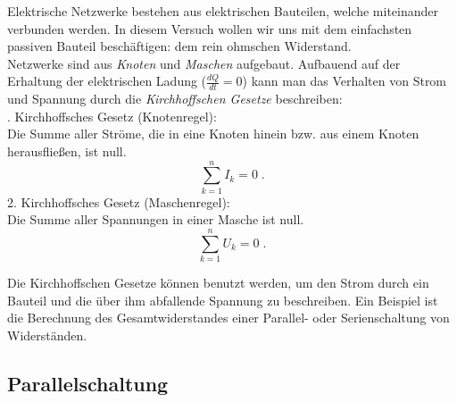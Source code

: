 Elektrische Netzwerke bestehen aus elektrischen Bauteilen, welche miteinander verbunden werden. In diesem Versuch wollen wir uns mit dem einfachsten passiven Bauteil beschäftigen: dem rein ohmschen Widerstand.\\
Netzwerke sind aus \textit{Knoten} und \textit{Maschen} aufgebaut. Aufbauend auf der Erhaltung der elektrischen Ladung ($\frac{dQ}{dt} = 0$) kann man das Verhalten von Strom und Spannung durch die \textit{Kirchhoffschen Gesetze} beschreiben:\\

. Kirchhoffsches Gesetz (Knotenregel): \\
	Die Summe aller Ströme, die in eine Knoten hinein bzw. aus einem Knoten herausfließen, ist null.
 \begin{equation}
  \sum^n_{k=1}{I_k} = 0 \; .
  \label{eq:Kirchhoff1}
 \end{equation}
%
2. Kirchhoffsches Gesetz (Maschenregel): \\
	Die Summe aller Spannungen in einer Masche ist null.
\begin{equation}
 \sum^n_{k=1}{U_k} = 0 \; .
 \label{eq:Kirchoff2}
\end{equation}

\noindent
Die Kirchhoffschen Gesetze können benutzt werden, um den Strom durch ein Bauteil und die über ihm abfallende Spannung zu beschreiben. Ein Beispiel ist die Berechnung des Gesamtwiderstandes einer Parallel- oder Serienschaltung von Widerständen.
%
\subsection{Parallelschaltung}

